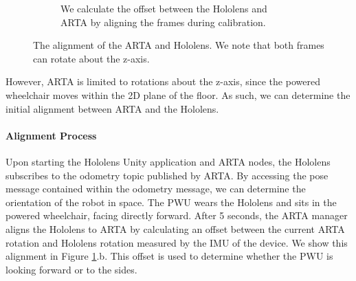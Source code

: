 \begin{figure}[ht]
\begin{subfigure}[b]{.45\textwidth}
		\caption{We calculate the offset between the Hololens and ARTA by aligning the frames during calibration.}
	\end{subfigure}
	\vspace{-1\baselineskip}
	\begin{center}
		\caption{The alignment of the ARTA and Hololens. We note that both frames can rotate about the z-axis.}
		\label{fig:holoArtaFrames}
	\end{center}
	\vspace{-2\baselineskip}
\end{figure}


However, ARTA is limited to rotations about the z-axis, since the powered wheelchair moves within the 2D plane of the floor. As such, we can determine the initial alignment between ARTA and the Hololens.

\paragraph{Alignment Process} Upon starting the Hololens Unity application and ARTA nodes, the Hololens subscribes to the odometry topic published by ARTA. By accessing the pose message contained within the odometry message, we can determine the orientation of the robot in space. The PWU wears the Hololens and sits in the powered wheelchair, facing directly forward. After 5 seconds, the ARTA manager aligns the Hololens to ARTA by calculating an offset between the current ARTA rotation and Hololens rotation measured by the IMU of the device. We show this alignment in Figure \ref{fig:holoArtaFrames}.b. This offset is used to determine whether the PWU is looking forward or to the sides. 
